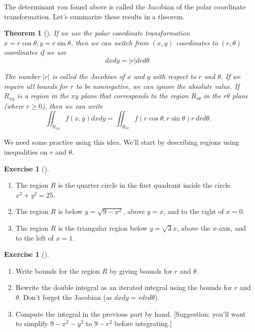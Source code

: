 \documentclass[10pt,]{book}
\theoremstyle{plain}
\newtheorem{theorem}{Theorem}[section]
\theoremstyle{definition}
\theoremstyle{definition}
\theoremstyle{definition}
\theoremstyle{definition}
\newtheorem{exploration}[project]{Exercise}
\theoremstyle{definition}
\numberwithin{equation}{section}
\begin{document}
The determinant you found above is called the Jacobian of the polar coordinate transformation. Let's summarize these results in a theorem.%
\begin{theorem}[{}]\label{theorem-10}
If we use the polar coordinate transformation \(x=r\cos\theta, y=r\sin\theta\), then we can switch from \((x,y)\) coordinates to \((r,\theta)\) coordinates if we use%
\begin{equation*}
dxdy=|r|drd\theta.
\end{equation*}
%
\par
The number \(|r|\) is called the Jacobian of \(x\) and \(y\) with respect to \(r\) and \(\theta\). If we require all bounds for \(r\) to be nonnegative, we can ignore the absolute value. If \(R_{xy}\) is a region in the \(xy\) plane that corresponds to the region \(R_{r\theta}\) in the \(r\theta\) plane (where \(r\geq 0\)), then we can write%
\begin{equation*}
\iint_{R_{xy}} f(x,y) dxdy = \iint_{R_{r\theta}} f(r\cos\theta,r\sin\theta) r\ drd\theta.
\end{equation*}
%
\end{theorem}
We need some practice using this idea. We'll start by describing regions using inequalities on \(r\) and \(\theta\).%
\begin{exploration}[]\label{exploration-263}
\leavevmode%
\begin{enumerate}[font=\bfseries,label=(\alph*),ref=\alph*]
\item\label{task-716} The region \(R\) is the quarter circle in the first quadrant inside the circle \(x^2+y^2=25\).%
\item\label{task-717} The region \(R\) is below \(y=\sqrt{9-x^2}\), above \(y=x\), and to the right of \(x=0\).%
\item\label{task-718} The region \(R\) is the triangular region below \(y=\sqrt 3 x\), above the \(x\)-axis, and to the left of \(x=1\).%
\end{enumerate}
\end{exploration}
\begin{exploration}[]\label{exploration-264}
\leavevmode%
\begin{enumerate}[font=\bfseries,label=(\alph*),ref=\alph*]
\item\label{task-719} Write bounds for the region \(R\) by giving bounds for \(r\) and \(\theta\).%
\item\label{task-720} Rewrite the double integral as an iterated integral using the bounds for \(r\) and \(\theta\). Don't forget the Jacobian (as \(dxdy=rdrd\theta\)).%
\item\label{task-721} Compute the integral in the previous part by hand. [Suggestion: you'll want to simplify \(9-x^2-y^2\) to \(9-r^2\) before integrating.]%
\end{enumerate}
\end{exploration}
\end{document}
